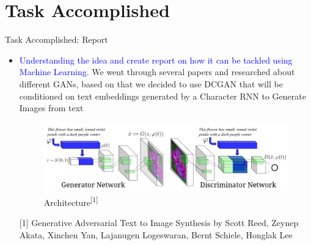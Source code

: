 \documentclass[10pt, a4paper]{beamer}
\begin{document}
\section{Task Accomplished}
\begin{frame}{Task Accomplished: Report}
	\begin{itemize}
	\item
{\textcolor{blue}{Understanding the idea and create report on how it can be tackled using Machine Learning.}\linebreak \linebreak
We went through several papers and researched  about different GANs, based on that we decided to use DCGAN that will be conditioned on text embeddings generated by a Character RNN to Generate Images from text
}

\begin{figure}
  \includegraphics[width=\linewidth]{architecture.png}
  \caption{Architecture\textsuperscript{[1]}}
  \label{fig:architecture}
\end{figure}
{\scriptsize{[1] Generative Adversarial Text to Image Synthesis by Scott Reed, Zeynep Akata, Xinchen Yan, Lajanugen Logeswaran, Bernt Schiele, Honglak Lee}}
	\end{itemize}
\end{frame}
\end{document}
